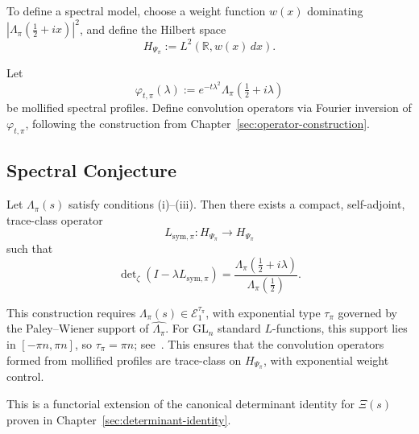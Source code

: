 \medskip
To define a spectral model, choose a weight function \( w(x) \) dominating \( |\Lambda_\pi(\tfrac{1}{2} + ix)|^2 \), and define the Hilbert space
\[
H_{\Psi_\pi} := L^2\left( \mathbb{R}, w(x)\, dx \right).
\]

Let
\[
\varphi_{t,\pi}(\lambda) := e^{-t\lambda^2} \Lambda_\pi\left( \tfrac{1}{2} + i\lambda \right)
\]
be mollified spectral profiles. Define convolution operators via Fourier inversion of \( \varphi_{t,\pi} \), following the construction from Chapter~\ref{sec:operator-construction}.

\subsection*{Spectral Conjecture}

\begin{conjecture}
Let \( \Lambda_\pi(s) \) satisfy conditions (i)--(iii). Then there exists a compact, self-adjoint, trace-class operator
\[
L_{\mathrm{sym},\pi} : H_{\Psi_\pi} \to H_{\Psi_\pi}
\]
such that
\[
\det\nolimits_\zeta\left( I - \lambda L_{\mathrm{sym},\pi} \right)
= \frac{ \Lambda_\pi\left( \tfrac{1}{2} + i\lambda \right) }{ \Lambda_\pi\left( \tfrac{1}{2} \right) }.
\]

\medskip
\noindent
This construction requires \( \Lambda_\pi(s) \in \mathcal{E}_1^{\tau_\pi} \), with exponential type \( \tau_\pi \) governed by the Paley–Wiener support of \( \widehat{\Lambda_\pi} \). For \( \mathrm{GL}_n \) standard \( L \)-functions, this support lies in \( [-\pi n, \pi n] \), so \( \tau_\pi = \pi n \); see~\cite[Thm.~3.2.4]{Levin1996EntireLectures}. This ensures that the convolution operators formed from mollified profiles are trace-class on \( H_{\Psi_\pi} \), with exponential weight control.
\end{conjecture}

This is a functorial extension of the canonical determinant identity for \( \Xi(s) \) proven in Chapter~\ref{sec:determinant-identity}.

